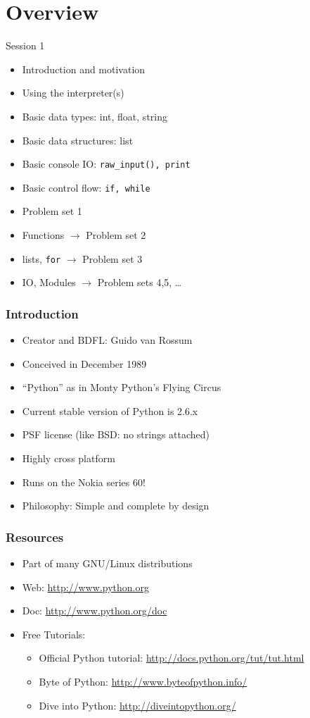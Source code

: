 \documentclass[14pt,compress]{beamer}
\begin{document}
\section{Overview}
\begin{frame}{Session 1}
  \begin{itemize}
	\item Introduction and motivation
	\item Using the interpreter(s)
	\item Basic data types: int, float, string
	\item Basic data structures: list
	\item Basic console IO: \texttt{raw\_input(), print}
    \item Basic control flow: \texttt{if, while}
	\item Problem set 1
    \item Functions $\rightarrow$ Problem set 2
    \item lists, \texttt{for}  $\rightarrow$ Problem set 3
    \item IO, Modules $\rightarrow$ Problem sets 4,5, \ldots
  \end{itemize}
\end{frame}

\begin{frame}
  \frametitle{Introduction}
  \begin{itemize}
  \item Creator and BDFL: Guido van Rossum
  \item Conceived in December 1989
  \item ``Python'' as in Monty Python's Flying Circus
  \item Current stable version of Python is 2.6.x
  \item PSF license (like BSD: no strings attached)
  \item Highly cross platform
  \item Runs on the Nokia series 60!
  \item \alert{Philosophy:} Simple and complete by design
  \end{itemize}
\end{frame}

\begin{frame}
  \frametitle{Resources}
  \begin{itemize}
  \item Part of many GNU/Linux distributions
  \item Web: \url{http://www.python.org}
  \item Doc: \url{http://www.python.org/doc}
  \item Free Tutorials:
    \begin{itemize}
    \item Official Python tutorial: \url{http://docs.python.org/tut/tut.html}
    \item Byte of Python: \url{http://www.byteofpython.info/}
    \item Dive into Python: \url{http://diveintopython.org/}
    \end{itemize}
  \end{itemize}
\end{frame}
\end{document}
